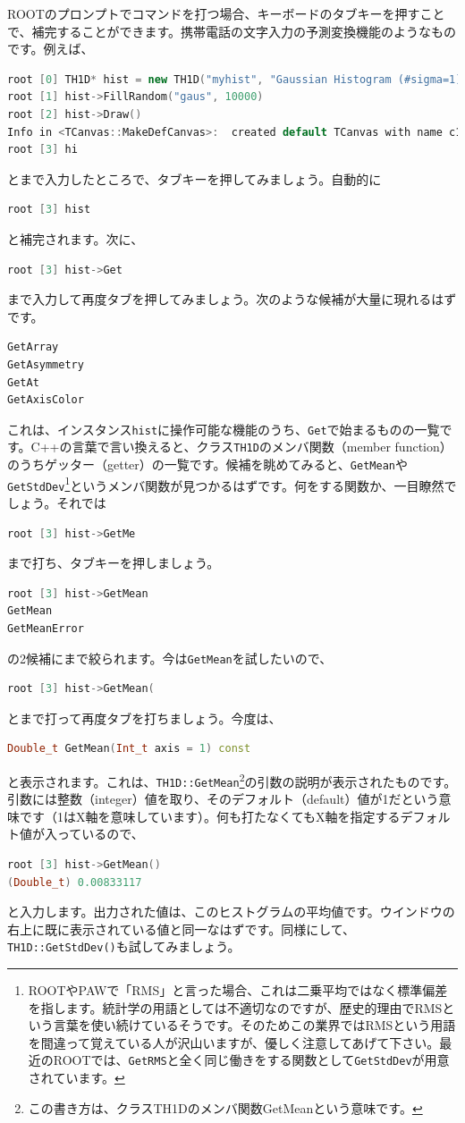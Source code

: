 ROOTのプロンプトでコマンドを打つ場合、キーボードのタブキーを押すことで、補完することができます。携帯電話の文字入力の予測変換機能のようなものです。例えば、
\begin{lstlisting}[language=c++]
root [0] TH1D* hist = new TH1D("myhist", "Gaussian Histogram (#sigma=1)", 50, -5, 5)
root [1] hist->FillRandom("gaus", 10000)
root [2] hist->Draw()
Info in <TCanvas::MakeDefCanvas>:  created default TCanvas with name c1
root [3] hi
\end{lstlisting}
とまで入力したところで、タブキーを押してみましょう。自動的に
\begin{lstlisting}[language=c++]
root [3] hist
\end{lstlisting}
と補完されます。次に、
\begin{lstlisting}[language=c++]
root [3] hist->Get
\end{lstlisting}
まで入力して再度タブを押してみましょう。次のような候補が大量に現れるはずです。
\begin{lstlisting}[language=c++]
GetArray
GetAsymmetry
GetAt
GetAxisColor
\end{lstlisting}
これは、インスタンス\texttt{hist}に操作可能な機能のうち、\texttt{Get}で始まるものの一覧です。C++の言葉で言い換えると、クラス\texttt{TH1D}のメンバ関数（member function）のうちゲッター（getter）の一覧です。候補を眺めてみると、\texttt{GetMean}や\texttt{GetStdDev}\footnote{ROOTやPAWで「RMS」と言った場合、これは二乗平均ではなく標準偏差を指します。統計学の用語としては不適切なのですが、歴史的理由でRMSという言葉を使い続けているそうです。そのためこの業界ではRMSという用語を間違って覚えている人が沢山いますが、優しく注意してあげて下さい。最近のROOTでは、\texttt{GetRMS}と全く同じ働きをする関数として\texttt{GetStdDev}が用意されています。}というメンバ関数が見つかるはずです。何をする関数か、一目瞭然でしょう。それでは
\begin{lstlisting}[language=c++]
root [3] hist->GetMe
\end{lstlisting}
まで打ち、タブキーを押しましょう。
\begin{lstlisting}[language=c++]
root [3] hist->GetMean
GetMean
GetMeanError
\end{lstlisting}
の2候補にまで絞られます。今は\texttt{GetMean}を試したいので、
\begin{lstlisting}[language=c++]
root [3] hist->GetMean(
\end{lstlisting}
とまで打って再度タブを打ちましょう。今度は、
\begin{lstlisting}[language=c++]
Double_t GetMean(Int_t axis = 1) const
\end{lstlisting}
と表示されます。これは、\texttt{TH1D::GetMean}\footnote{この書き方は、クラスTH1Dのメンバ関数GetMeanという意味です。}の引数の説明が表示されたものです。引数には整数（integer）値を取り、そのデフォルト（default）値が1だという意味です（1はX軸を意味しています）。何も打たなくてもX軸を指定するデフォルト値が入っているので、
\begin{lstlisting}[language=c++]
root [3] hist->GetMean()
(Double_t) 0.00833117
\end{lstlisting}
と入力します。出力された値は、このヒストグラムの平均値です。ウインドウの右上に既に表示されている値と同一なはずです。同様にして、\texttt{TH1D::GetStdDev()}も試してみましょう。

